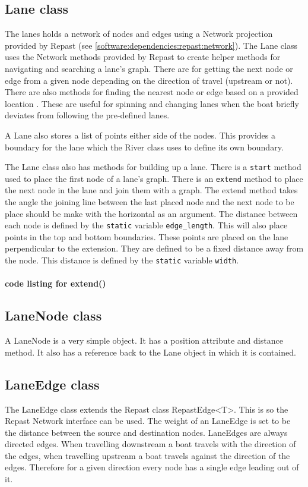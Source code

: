 \subsection{Lane class}

The lanes holds a network of nodes and edges using a Network
projection provided by Repast (see
\ref{software:dependencies:repast:network}). The Lane class uses the
Network methods provided by Repast to create helper methods for
navigating and searching a lane's graph. There are for getting the
next node or edge from a given node depending on the direction of
travel (upstream or not). There are also methods for finding the
nearest node or edge based on a provided location . These are useful
for spinning and changing lanes when the boat briefly deviates from
following the pre-defined lanes.

A Lane also stores a list of points either side of the nodes. This
provides a boundary for the lane which the River class uses to define
its own boundary.

The Lane class also has methods for building up a lane. There is a
\texttt{start} method used to place the first node of a lane's
graph. There is an \texttt{extend} method to place the next node in
the lane and join them with a graph. The extend method takes the angle
the joining line between the last placed node and the next node to be
place should be make with the horizontal as an argument. The distance
between each node is defined by the \texttt{static} variable
\texttt{edge\_length}. This will also place points in the top and
bottom boundaries. These points are placed on the lane perpendicular
to the extension. They are defined to be a fixed distance away from
the node. This distance is defined by the \texttt{static} variable
\texttt{width}.

\paragraph{code listing for extend()}


\subsection{LaneNode class}
A LaneNode is a very simple object. It has a position attribute and
distance method. It also has a reference back to the Lane object in
which it is contained.
\subsection{LaneEdge class}
The LaneEdge class extends the Repast class RepastEdge<T>. This is so
the Repast Network interface can be used. The weight of an LaneEdge is
set to be the distance between the source and destination
nodes. LaneEdges are always directed edges. When travelling downstream
a boat travels with the direction of the edges, when travelling
upstream a boat travels against the direction of the edges. Therefore
for a given direction every node has a single edge leading out of it.

